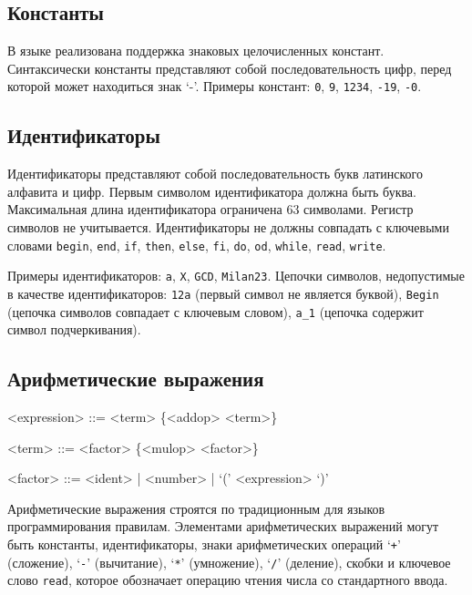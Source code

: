 \documentclass[a4paper,12pt]{article}
\begin{document}
\subsection{Константы}

В языке реализована поддержка знаковых целочисленных констант. Синтаксически
константы представляют собой последовательность цифр, перед которой может
находиться знак `-'. Примеры констант: \texttt{0}, \texttt{9}, \texttt{1234},
\texttt{-19}, \texttt{-0}.

\subsection{Идентификаторы}

Идентификаторы представляют собой последовательность букв латинского алфавита и
цифр. Первым символом идентификатора должна быть буква. Максимальная длина
идентификатора ограничена 63 символами. Регистр символов не учитывается.
Идентификаторы не должны совпадать с ключевыми словами \texttt{begin},
\texttt{end}, \texttt{if}, \texttt{then}, \texttt{else}, \texttt{fi},
\texttt{do}, \texttt{od}, \texttt{while}, \texttt{read}, \texttt{write}.

Примеры идентификаторов: \texttt{a}, \texttt{X}, \texttt{GCD}, \texttt{Milan23}.
Цепочки символов, недопустимые в качестве идентификаторов: \texttt{12a} (первый
символ не является буквой), \texttt{Begin} (цепочка символов совпадает с
ключевым словом), \texttt{a\_1} (цепочка содержит символ подчеркивания).

\subsection{Арифметические выражения}

\begin{grammar}
<expression> ::= <term> \{<addop> <term>\}

<term> ::= <factor> \{<mulop> <factor>\}

<factor> ::= <ident> | <number> | `(' <expression> `)'
\end{grammar}

Арифметические выражения строятся по традиционным для языков программирования
правилам. Элементами арифметических выражений могут быть константы,
идентификаторы, знаки арифметических операций `\texttt{+}' (сложение),
`\texttt{-}' (вычитание), `\texttt{*}' (умножение), `\texttt{/}'
(деление), скобки и ключевое слово \texttt{read}, которое обозначает операцию
чтения числа со стандартного ввода.
\end{document}
